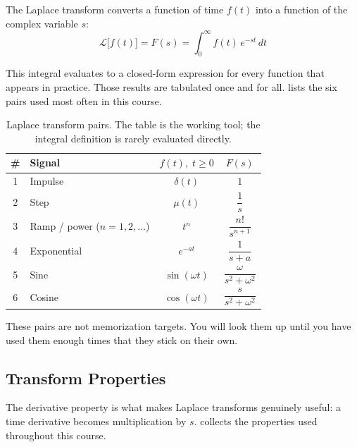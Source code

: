 \documentclass[12pt]{article}
\begin{document}
The Laplace transform converts a function of time $f(t)$ into a function of
the complex variable $s$:
\begin{equation}
  \mathcal{L}\bigl[f(t)\bigr] = F(s) = \int_0^{\infty} f(t)\, e^{-st}\, dt
  \label{eq:definition}
\end{equation}

This integral evaluates to a closed-form expression for every function that
appears in practice.  Those results are tabulated once and for all.
 lists the six pairs used most often in this course.

\begin{table}[htbp]
\centering
\caption{Laplace transform pairs.  The table is the working tool; the integral
  definition is rarely evaluated directly.}
\label{tab:pairs}
\begin{tabular}{clcc}
\toprule
\# & Signal & $f(t),\; t \geq 0$ & $F(s)$ \\
\midrule
1 & Impulse     & $\delta(t)$       & $1$ \\[4pt]
2 & Step        & $\mu(t)$          & $\dfrac{1}{s}$ \\[8pt]
3 & Ramp / power ($n = 1, 2, \ldots$) & $t^n$ & $\dfrac{n!}{s^{n+1}}$ \\[8pt]
4 & Exponential & $e^{-at}$         & $\dfrac{1}{s+a}$ \\[8pt]
5 & Sine        & $\sin(\omega t)$  & $\dfrac{\omega}{s^2+\omega^2}$ \\[8pt]
6 & Cosine      & $\cos(\omega t)$  & $\dfrac{s}{s^2+\omega^2}$ \\[4pt]
\bottomrule
\end{tabular}
\end{table}

These pairs are not memorization targets.  You will look them up until you have
used them enough times that they stick on their own.

\subsection{Transform Properties}
\label{sec:theorems}

The derivative property is what makes Laplace transforms genuinely useful: a
time derivative becomes multiplication by $s$.   collects
the properties used throughout this course.
\end{document}
